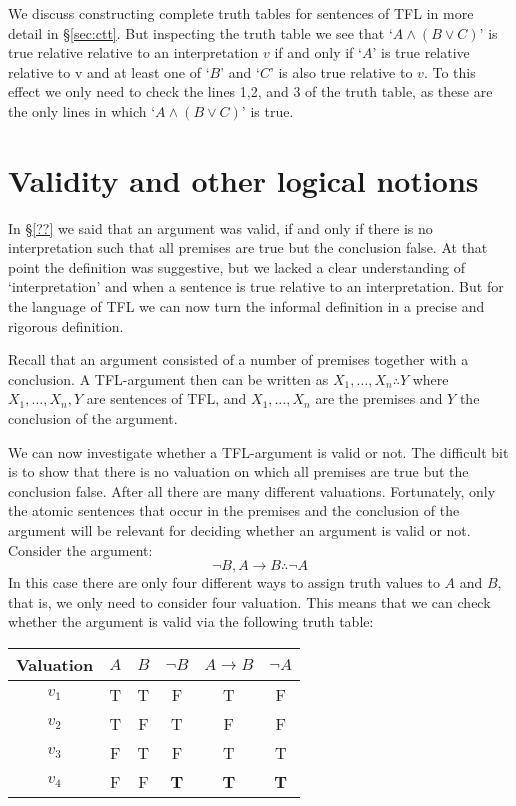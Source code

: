 We discuss constructing complete truth tables for sentences of TFL in more detail in \S\ref{sec:ctt}. But inspecting the truth table we see that `$A\wedge(B\vee C)$' is true relative relative to an interpretation $v$ if and only if `$A$' is true relative relative to v and at least one of `$B$' and `$C$' is also true relative to $v$. To this effect we only need to check the lines 1,2, and 3 of the truth table, as these are the only lines in which `$A\wedge(B\vee C)$' is true. 
 


 
 \section{Validity and other logical notions}
 In \S\ref{??} we said that an argument was valid, if and only if there is no interpretation such that all premises are true but the conclusion false. At that point the definition was suggestive, but we lacked a clear understanding of `interpretation' and when a sentence is true relative to an interpretation. But for the language of TFL we can now turn the informal definition in a precise and rigorous definition.
 
 Recall that an argument consisted of a number of premises together with a conclusion. A TFL-argument then can be written as $X_1,\ldots,X_n\therefore Y$ where $X_1,\ldots,X_n, Y$ are sentences of TFL, and $X_1,\ldots,X_n$ are the premises and $Y$ the conclusion of the argument.
 
 
 We can now investigate whether a TFL-argument is valid or not. The difficult bit is to show that there is no valuation on which all premises are true but the conclusion false. After all there are many different valuations. Fortunately, only the atomic sentences that occur in the premises and the conclusion of the argument will be relevant for deciding whether an argument is valid or not. Consider the argument:
 $$\neg B,A\rightarrow B\therefore\neg A$$
 In this case there are only four different ways to assign truth values to $A$ and $B$, that is, we only need to consider four valuation. This means that we can check whether the argument is valid via the following truth table:
 
 \begin{center}
\begin{tabular}{c|cc|c|c||c}
Valuation&$A$&$B$&$\neg B$&$A\rightarrow B$&$\neg A$\\\hline
$v_1$&T & T & F & T & F\\
$v_2$&T & F & T & F & F\\
$v_3$&F & T & F & T & T\\
$v_4$&F & F & \textbf{T}& \textbf{T} & \textbf{T}
\end{tabular}
\end{center}

